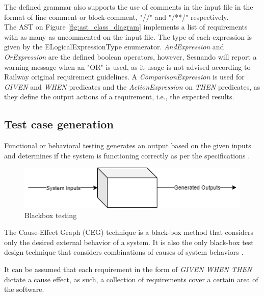 The defined grammar also supports the use of comments in the input file in the format of line comment or block-comment, "//" and "/**/" respectively.\\
The AST on Figure \ref{fig:ast_class_diagram} implements a list of requirements with as many as uncommented on the input file. The type of each expression is given by the ELogicalExpressionType enumerator. \textit{AndExpression} and \textit{OrExpression} are the defined boolean operators, however, Sesnando will report a warning message when an "OR" is used, as it usage is not advised according to Railway original requirement guidelines. A \textit{ComparisonExpression} is used for \textit{GIVEN} and \textit{WHEN} predicates and the \textit{ActionExpression} on \textit{THEN} predicates, as they define the output actions of a requirement, i.e., the expected results.


\subsection{Test case generation}
\label{subsec:def_test_case_gen}

Functional or behavioral testing generates an output based on the given inputs and determines if the system is functioning correctly as per the specifications \cite{jorgensen_software_2011}.\\

\begin{figure}[H]
    \centering
    \includegraphics[scale=0.65]{images/functional_inputs_outputs.png}
    \caption{Blackbox testing}
    \label{fig:blackbox_testing}
\end{figure}

The Cause-Effect Graph (CEG) technique is a black-box method that considers only the desired external behavior of a system. It is also the only black-box test design technique that considers combinations of causes of system behaviors \cite{nursimulu_cause-effect_1995}.

It can be assumed that each requirement in the form of \textit{GIVEN WHEN THEN} dictate a cause effect, as such, a collection of requirements cover a certain area of the software.\\

